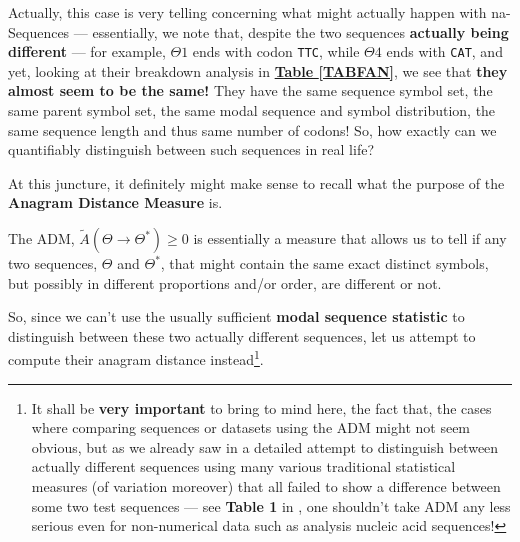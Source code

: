 \documentclass[a4paper, 18pt]{book} %
\begin{document}
Actually, this case is very telling concerning what might actually happen with na-Sequences --- essentially, we note that, despite the two sequences \textbf{actually being different} --- for example, $\Theta1$ ends with codon \texttt{TTC}, while $\Theta4$ ends with \texttt{CAT}, and yet, looking at their breakdown analysis in \textbf{\hyperref[TABFAN]{Table \ref{TABFAN}}}, we see that \textbf{they almost seem to be the same!} They have the same sequence symbol set, the same parent symbol set, the same modal sequence and symbol distribution, the same sequence length and thus same number of codons! So, how exactly can we quantifiably distinguish between such sequences in real life?

At this juncture, it definitely might make sense to recall what the purpose of the \textbf{Anagram Distance Measure}\cite{adtpaper} is.

The ADM, $\tilde{A}(\Theta \rightarrow \Theta^*) \geq 0$ is essentially a measure that allows us to tell if any two sequences, $\Theta$ and $\Theta^*$, that might contain the same exact distinct symbols, but possibly in different proportions and/or order, are different or not. 

So, since we can't use the usually sufficient\cite{transformatics} \textbf{modal sequence statistic} to distinguish between these two actually different sequences, let us attempt to compute their anagram distance instead\footnote{It shall be \textbf{very important} to bring to mind here, the fact that, the cases where comparing sequences or datasets using the ADM might not seem obvious, but as we already saw in a detailed attempt to distinguish between actually different sequences using many various traditional statistical measures  (of variation moreover) that all failed to show a difference between some two test sequences --- see \textbf{Table 1} in \cite{transformatics}, one shouldn't take ADM any less serious even for non-numerical data such as analysis nucleic acid sequences!}. 
\end{document}
